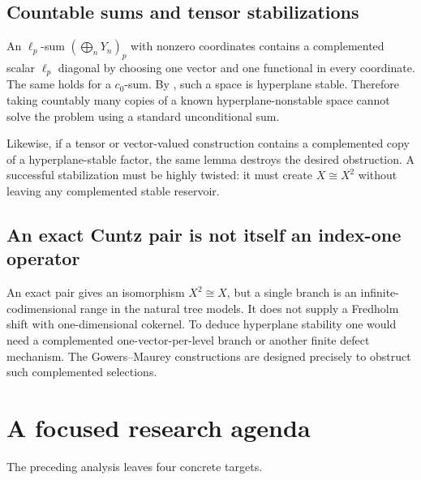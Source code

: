 \documentclass[11pt]{article}
\theoremstyle{definition}
\theoremstyle{remark}
\begin{document}
\subsection{Countable sums and tensor stabilizations}

An $\ell_p$-sum $(\bigoplus_nY_n)_p$ with nonzero coordinates contains a
complemented scalar $\ell_p$ diagonal by choosing one vector and one functional
in every coordinate.  The same holds for a $c_0$-sum.  By
, such a space is hyperplane stable.  Therefore taking
countably many copies of a known hyperplane-nonstable space cannot solve the
problem using a standard unconditional sum.

Likewise, if a tensor or vector-valued construction contains a complemented
copy of a hyperplane-stable factor, the same lemma destroys the desired
obstruction.  A successful stabilization must be highly twisted: it must create
$X\cong X^2$ without leaving any complemented stable reservoir.

\subsection{An exact Cuntz pair is not itself an index-one operator}

An exact pair gives an isomorphism $X^2\cong X$, but a single branch is an
infinite-codimensional range in the natural tree models.  It does not supply a
Fredholm shift with one-dimensional cokernel.  To deduce hyperplane stability
one would need a complemented one-vector-per-level branch or another finite
defect mechanism.  The Gowers--Maurey constructions are designed precisely to
obstruct such complemented selections.

\section{A focused research agenda}

The preceding analysis leaves four concrete targets.
\end{document}
